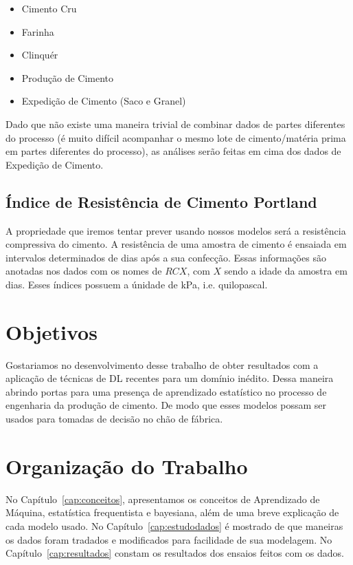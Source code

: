 \begin{itemize}
        \item Cimento Cru
        \item Farinha
        \item Clinquér
        \item Produção de Cimento
        \item Expedição de Cimento (Saco e Granel)
\end{itemize}

Dado que não existe uma maneira trivial de combinar dados de partes diferentes do processo (é muito difícil acompanhar o mesmo lote de cimento/matéria prima em partes diferentes do processo), as análises serão feitas em cima dos dados de Expedição de Cimento.

\subsection{Índice de Resistência de Cimento Portland}
\label{sec:rc}
A propriedade que iremos tentar prever usando nossos modelos será a resistência
compressiva do cimento. A resistência de uma amostra de cimento é ensaiada em
intervalos determinados de dias após a sua confecção. Essas informações são
anotadas nos dados com os nomes de $RCX$, com $X$ sendo a idade da amostra em
dias. Esses índices possuem a únidade de kPa, i.e. quilopascal.

\section{Objetivos}
\label{sec:objetivo}

Gostariamos no desenvolvimento desse trabalho de obter resultados com a
aplicação de técnicas de DL recentes para um domínio inédito. Dessa maneira
abrindo portas para uma presença de aprendizado estatístico no processo de
engenharia da produção de cimento. De modo que esses modelos possam ser usados para tomadas de decisão no chão de fábrica.


\section{Organização do Trabalho}
\label{sec:organizacao_trabalho}

No Capítulo~\ref{cap:conceitos}, apresentamos os conceitos de Aprendizado de
Máquina, estatística frequentista e bayesiana, além de uma breve explicação
de cada modelo usado. No Capítulo~\ref{cap:estudodados} é mostrado de que
maneiras os dados foram tradados e modificados para facilidade de sua modelagem.
No Capítulo~\ref{cap:resultados} constam os resultados dos ensaios feitos com os dados. 



